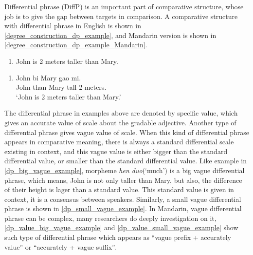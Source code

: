 \documentclass{ctexart}
\let \cite \parencite
\begin{document}
Differential phrase (DiffP) is an important part of comparative structure, whose job is to give the gap between targets in comparison. A comparative structure with differential phrase in English is shown in \ref{degree_construction_dp_example}, and Mandarin version is shown in \ref{degree_construction_dp_example_Mandarin}.

\begin{enumerate}
    \item \label{degree_construction_dp_example}
    John is 2 meters taller than Mary.
\end{enumerate}

\begin{enumerate}
    \item \label{degree_construction_dp_example_Mandarin}
    John \enspace bi \enspace Mary \enspace gao  mi.  \\
    John than Mary \enspace tall 2 meters. \\
    `John is 2 meters taller than Mary.'
\end{enumerate}

The differential phrase in examples above are denoted by specific value, which gives an accurate value of scale about the gradable adjective. Another type of differential phrase gives vague value of scale. When this kind of differential phrase appears in comparative meaning, there is always a standard differential scale existing in context, and this vague value is either bigger than the standard differential value, or smaller than the standard differential value. Like example in \ref{dp_big_vague_example}, morpheme \textit{hen duo}(`much') is a big vague differential phrase, which means, John is not only taller than Mary, but also, the difference of their height is lager than a standard value. This standard value is given in context, it is a consensus between speakers. Similarly, a small vague differential phrase is shown in \ref{dp_small_vague_example}. In Mandarin, vague differential phrase can be complex, many researchers \cite{lin2014,li2015} do deeply investigation on it, \ref{dp_value_big_vague_example} and \ref{dp_value_small_vague_example} show such type of differential phrase which appears as ``vague prefix + accurately value'' or ``accurately + vague suffix''.
\end{document}
